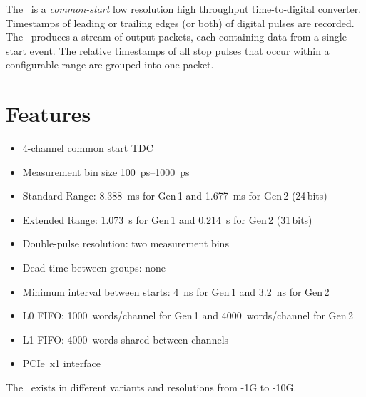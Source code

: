The \deviceName\ is a \emph{common-start} low resolution high throughput time-to-digital converter. 
Timestamps of leading or trailing edges (or both) of digital pulses are recorded. 
The \deviceName\ produces a stream of output packets, each containing data from a single start event. 
The relative timestamps of all stop pulses that occur within a configurable range are grouped into one packet.

\section{Features} \label{sec:features}
	\begin{itemize}
		\item 4-channel common start TDC
		\item Measurement bin size \SIrange{100}{1000}{\pico\second}
		\item Standard Range: \SI{8.388}{\milli\second} for Gen\,1 and \SI{1.677}{\milli\second} for Gen\,2 (24\,bits)
		\item Extended Range: \SI{1.073}{\second} for Gen\,1 and \SI{0.214}{\second} for Gen\,2 (31\,bits)
		\item Double-pulse resolution: two measurement bins 
		\item Dead time between groups: none
		\item Minimum interval between starts: \SI{4}{\nano\second} for Gen\,1 and \SI{3.2}{\nano\second} for Gen\,2
		\item L0 FIFO: 1000~words/channel for Gen\,1 and 4000~words/channel for Gen\,2
		\item L1 FIFO: 4000~words shared between channels
		\item PCIe~x1 interface
	\end{itemize} 

	The \deviceName\ exists in different variants and resolutions from \deviceName-1G to \deviceName-10G.  

